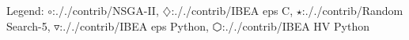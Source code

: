 Legend: {\color{NavyBlue}$\circ$}:././contrib/NSGA-II, {\color{Magenta}$\diamondsuit$}:././contrib/IBEA eps C, {\color{Orange}$\star$}:././contrib/Random Search-5, {\color{CornflowerBlue}$\triangledown$}:././contrib/IBEA eps Python, {\color{red}$\varhexagon$}:././contrib/IBEA HV Python
